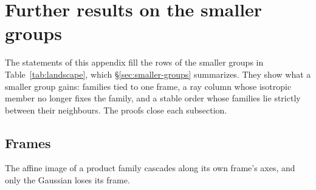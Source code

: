 
\section{Further results on the smaller groups}\label{app:smaller-groups}

The statements of this appendix fill the rows of the smaller groups in Table~\ref{tab:landscape},
which \S\ref{sec:smaller-groups} summarizes. They show what a smaller group gains: families tied to
one frame, a ray column whose isotropic member no longer fixes the family, and a stable order whose
families lie strictly between their neighbours. The proofs close each subsection.

\subsection{Frames}

The affine image of a product family cascades along its own frame's axes, and only the Gaussian loses
its frame.

